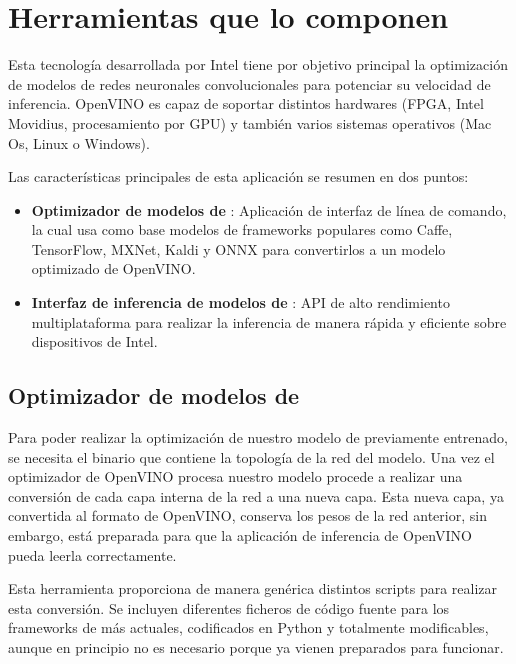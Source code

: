 \section{Herramientas que lo componen}\label{sec:herramientas-que-lo-componen}
Esta tecnología desarrollada por Intel tiene por objetivo principal la optimización de modelos de redes neuronales convolucionales para potenciar su velocidad de inferencia.
OpenVINO es capaz de soportar distintos hardwares (FPGA, Intel Movidius, procesamiento por GPU\@) y también varios sistemas operativos (Mac Os, Linux o Windows).

Las características principales de esta aplicación se resumen en dos puntos:

\begin{itemize}
    \item \textbf{Optimizador de modelos de }: Aplicación de interfaz de línea de comando, la cual usa como base modelos de frameworks populares como Caffe, TensorFlow, MXNet, Kaldi y ONNX para convertirlos a un modelo optimizado de OpenVINO.
    \item \textbf{Interfaz de inferencia de modelos de }: API de alto rendimiento multiplataforma para realizar la inferencia de manera rápida y eficiente sobre dispositivos de Intel.
\end{itemize}

\subsection{Optimizador de modelos de }\label{subsec:optimizador-de-modelos-de-deep-learning}
Para poder realizar la optimización de nuestro modelo de  previamente entrenado, se necesita el binario que contiene la topología de la red del modelo.
Una vez el optimizador de OpenVINO procesa nuestro modelo procede a realizar una conversión de cada capa interna de la red a una nueva capa.
Esta nueva capa, ya convertida al formato de OpenVINO, conserva los pesos de la red anterior,
sin embargo, está preparada para que la aplicación de inferencia de OpenVINO pueda leerla correctamente.

Esta herramienta proporciona de manera genérica distintos scripts para realizar esta conversión.
Se incluyen diferentes ficheros de código fuente para los frameworks de  más actuales, codificados en Python y totalmente modificables, aunque en principio no es necesario porque ya vienen preparados para funcionar.

